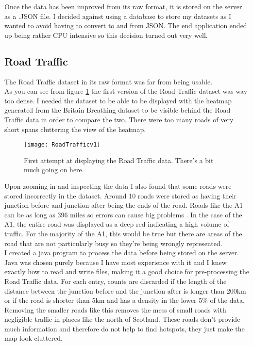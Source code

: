 Once the data has been improved from its raw format, it is stored on the server as a .JSON file. I decided against using a database to store my datasets as I wanted to avoid having to convert to and from JSON. The end application ended up being rather CPU intensive so this decision turned out very well.

\subsection{Road Traffic}

The Road Traffic dataset in its raw format was far from being usable.\\

As you can see from figure \ref{fig:rt} the first version of the Road Traffic dataset was way too dense. I needed the dataset to be able to be displayed with the heatmap generated from the Britain Breathing dataset to be visible behind the Road Traffic data in order to compare the two. There were too many roads of very short spans cluttering the view of the heatmap.\\

\begin{figure}[H]
\begin{center}
\texttt{[image: RoadTrafficv1]}
\caption{First attempt at displaying the Road Traffic data. There's a bit much going on here.}
\label{fig:rt}
\end{center}
\end{figure}

Upon zooming in and inspecting the data I also found that some roads were stored incorrectly in the dataset. Around 10 roads were stored as having their junction before and junction after being the ends of the road. Roads like the A1 can be as long as 396 miles so errors can cause big problems \cite{longestRoad}. In the case of the A1, the entire road was displayed as a deep red indicating a high volume of traffic. For the majority of the A1, this would be true but there are areas of the road that are not particularly busy so they're being wrongly represented. \\

I created a java program to process the data before being stored on the server. Java was chosen purely because I have most experience with it and I knew exactly how to read and write files, making it a good choice for pre-processing the Road Traffic data. For each entry, counts are discarded if the length of the distance between the junction before and the junction after is longer than 200km or if the road is shorter than 5km and has a density in the lower 5\% of the data. Removing the smaller roads like this removes the mess of small roads with negligible traffic in places like the north of Scotland. These roads don't provide much information and therefore do not help to find hotspots, they just make the map look cluttered.\\

